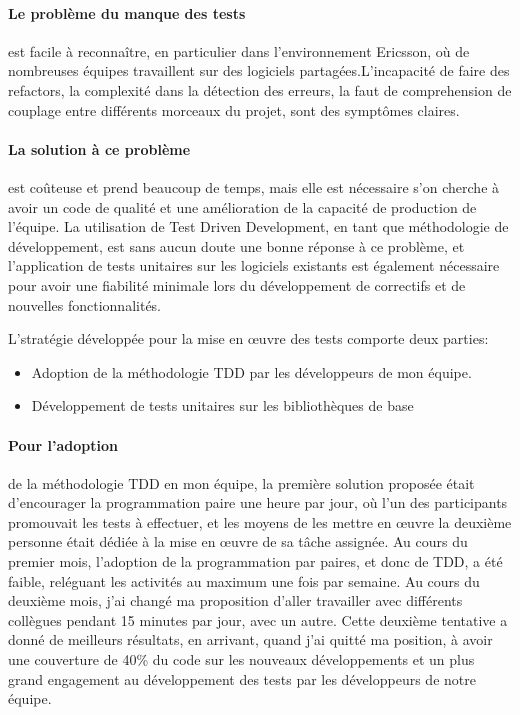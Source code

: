 \documentclass{resume} %
\begin{document}
\paragraph {Le problème du manque des tests} est facile à reconnaître, en particulier dans l'environnement Ericsson, où de nombreuses équipes travaillent sur des logiciels partagées.L'incapacité de faire des refactors, la complexité dans la détection des erreurs, la faut de comprehension de couplage entre différents morceaux du projet, sont des symptômes claires. 

\paragraph {La solution à ce problème} est coûteuse et prend beaucoup de temps, mais elle est nécessaire s'on cherche à avoir un code de qualité et une amélioration de la capacité de production de l'équipe. La utilisation de Test Driven Development, en tant que méthodologie de développement, est sans aucun doute une bonne réponse à ce problème, et l'application de tests unitaires sur les logiciels existants est également nécessaire pour avoir une fiabilité minimale lors du développement de correctifs et de nouvelles fonctionnalités.

L'stratégie développée pour la mise en œuvre des tests comporte deux parties:
\begin {itemize}
\item Adoption de la méthodologie TDD par les développeurs de mon équipe.
\item Développement de tests unitaires sur les bibliothèques de base
\end {itemize}

\paragraph {Pour l'adoption} de la méthodologie TDD en mon équipe, la première solution proposée était d'encourager la programmation paire une heure par jour, où l'un des participants promouvait les tests à effectuer, et les moyens de les mettre en œuvre la deuxième personne était dédiée à la mise en œuvre de sa tâche assignée.
Au cours du premier mois, l'adoption de la programmation par paires, et donc de TDD, a été faible, reléguant les activités au maximum une fois par semaine.
Au cours du deuxième mois, j'ai changé ma proposition d'aller travailler avec différents collègues pendant 15 minutes par jour, avec un autre.
Cette deuxième tentative a donné de meilleurs résultats, en arrivant, quand j'ai quitté ma position, à avoir une couverture de 40\% du code sur les nouveaux développements et un plus grand engagement au développement des tests par les développeurs de notre équipe.
\end{document}
